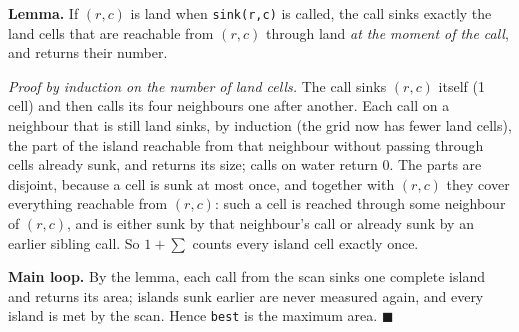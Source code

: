 \begin{invariantbox}
\textbf{Lemma.} If $(r,c)$ is land when \texttt{sink(r,c)} is called, the call sinks exactly the land cells that are reachable from $(r,c)$ through land \emph{at the moment of the call}, and returns their number.

\emph{Proof by induction on the number of land cells.} The call sinks $(r,c)$ itself (1 cell) and then calls its four neighbours one after another. Each call on a neighbour that is still land sinks, by induction (the grid now has fewer land cells), the part of the island reachable from that neighbour without passing through cells already sunk, and returns its size; calls on water return 0. The parts are disjoint, because a cell is sunk at most once, and together with $(r,c)$ they cover everything reachable from $(r,c)$: such a cell is reached through some neighbour of $(r,c)$, and is either sunk by that neighbour's call or already sunk by an earlier sibling call. So $1 + \sum$ counts every island cell exactly once.

\textbf{Main loop.} By the lemma, each call from the scan sinks one complete island and returns its area; islands sunk earlier are never measured again, and every island is met by the scan. Hence \texttt{best} is the maximum area. \hfill$\blacksquare$
\end{invariantbox}

